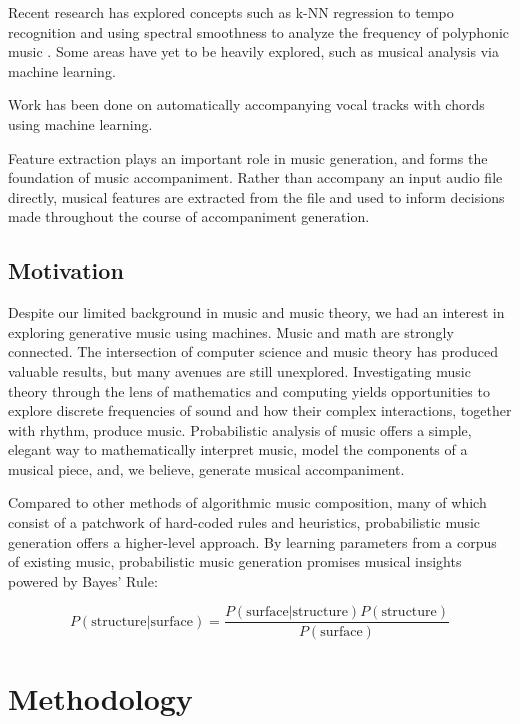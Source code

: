 \documentclass[11pt,conference,letterpaper]{IEEEtran}
\begin{document}
Recent research has explored concepts such as k-NN regression to tempo recognition \cite{eronen2010music} and using spectral smoothness to analyze the frequency of polyphonic music \cite{klapuri2003multiple}. Some areas have yet to be heavily explored, such as musical analysis via machine learning.

Work has been done on automatically accompanying vocal tracks with chords \cite{simon2008mysong} using machine learning. \cite{morris2008exposing}

Feature extraction plays an important role in music generation, and forms the foundation of music accompaniment. Rather than accompany an input audio file directly, musical features are extracted from the file and used to inform decisions made throughout the course of accompaniment generation.

\subsection{Motivation}

Despite our limited background in music and music theory, we had an interest in exploring generative music using machines. Music and math are strongly connected. The intersection of computer science and music theory has produced valuable results, but many avenues are still unexplored. Investigating music theory through the lens of mathematics and computing yields opportunities to explore discrete frequencies of sound and how their complex interactions, together with rhythm, produce music. Probabilistic analysis of music offers a simple, elegant way to mathematically interpret music, model the components of a musical piece, and, we believe, generate musical accompaniment.

Compared to other methods of algorithmic music composition, many of which consist of a patchwork of hard-coded rules and heuristics, probabilistic music generation offers a higher-level approach. By learning parameters from a corpus of existing music, probabilistic music generation promises musical insights powered by Bayes' Rule:

{\small
  \[ P(\text{structure}|\text{surface}) = \frac{P(\text{surface}|\text{structure})P(\text{structure})}{P(\text{surface})} \]
}


\section{Methodology}
\end{document}

